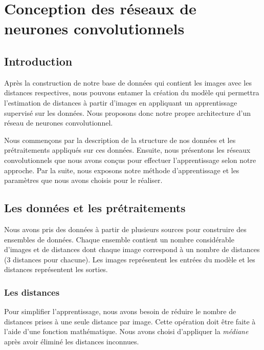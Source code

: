 \chapter{Conception des réseaux de neurones convolutionnels}

\section{Introduction}

Après la construction de notre base de données qui contient les images avec
les distances respectives, nous pouvons entamer la création du modèle qui
permettra l'estimation de distances à partir d'images en appliquant un
apprentissage supervisé sur les données. Nous proposons donc notre propre
architecture d'un réseau de neurones convolutionnel.

Nous commençons par la description de la structure de nos
données et les prétraitements appliqués sur ces données. Ensuite, nous présentons
les réseaux convolutionnels que nous avons conçus pour effectuer l'apprentissage
selon notre approche.
Par la suite, nous exposons notre méthode d'apprentissage et les paramètres
que nous avons choisis pour le réaliser.

\section{Les données et les prétraitements}

Nous avons pris des données à partir de plusieurs sources pour construire des
ensembles de données. Chaque ensemble contient un nombre considérable d'images et
de distances dont chaque image correspond à un nombre de distances ($3$ distances
pour chacune). Les images représentent les entrées du modèle et les distances
représentent les sorties.

\subsection{Les distances}

Pour simplifier l'apprentissage, nous avons besoin de réduire le nombre de
distances prises à une seule distance par image. Cette opération doit être faite
à l'aide d'une fonction mathématique. Nous avons choisi d'appliquer la
\emph{médiane} après avoir éliminé les distances inconnues.

